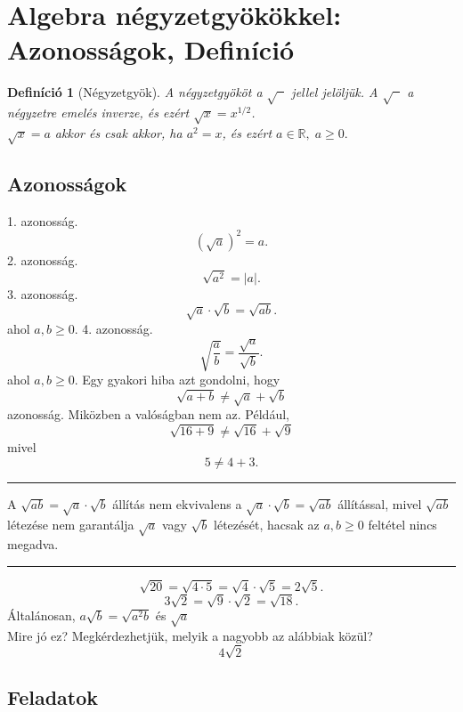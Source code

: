\documentclass{article}
\newtheorem{definition}{Definíció}
\begin{document}
\section{Algebra négyzetgyökökkel: Azonosságok, Definíció}
\begin{definition}[Négyzetgyök]
    A négyzetgyököt a $\sqrt{\phantom{x}}$ jellel jelöljük. A $\sqrt{\phantom{x}}$ a négyzetre emelés inverze, és ezért $\sqrt{x} = x^{1/2}$.\\
    $\sqrt{x} = a$ akkor és csak akkor, ha $a^2 = x$, és ezért $a \in \mathbb{R},\; a \ge 0.$  
\end{definition}

\subsection{Azonosságok}
1. azonosság.
\[
    (\sqrt{a})^2 = a.
\]
2. azonosság.
\[
    \sqrt{a^2} = |a|.
\]
3. azonosság.
\[
    \sqrt{a} \cdot \sqrt{b} = \sqrt{ab}.
\]
ahol $a, b \ge 0.$
4. azonosság.
\[
    \sqrt{\frac{a}{b}} = \frac{\sqrt{a}}{\sqrt{b}}.
\]
ahol $a, b \ge 0.$
Egy gyakori hiba azt gondolni, hogy
\[
    \sqrt{a + b} \not= \sqrt{a} + \sqrt{b}
\]
azonosság. Miközben a valóságban nem az. Például,
\[
    \sqrt{16 + 9} \not= \sqrt{16} + \sqrt{9}
\]
mivel
\[
    5 \not= 4 + 3.
\]

\vspace{10pt}
\hrule
\vspace{10pt}

A $\sqrt{ab} = \sqrt{a} \cdot \sqrt{b}$ állítás nem ekvivalens a $\sqrt{a} \cdot \sqrt{b} = \sqrt{ab}$ állítással, mivel $\sqrt{ab}$ létezése nem garantálja $\sqrt{a}$ vagy $\sqrt{b}$ létezését, hacsak az $a, b \ge 0$ feltétel nincs megadva.

\vspace{10pt}
\hrule
\vspace{10pt}

\[
\sqrt{20} = \sqrt{4\cdot5} = \sqrt{4} \cdot \sqrt{5} = 2\sqrt{5}.
\]
\[
3\sqrt{2} = \sqrt{9} \cdot \sqrt{2} = \sqrt{18}.
\]
Általánosan, $a\sqrt{b} = \sqrt{a^2b}$ és $\sqrt{a}$\\ %

Mire jó ez? Megkérdezhetjük, melyik a nagyobb az alábbiak közül?
\[
    4\sqrt{2}  %
\]

\subsection{Feladatok}
\end{document}
